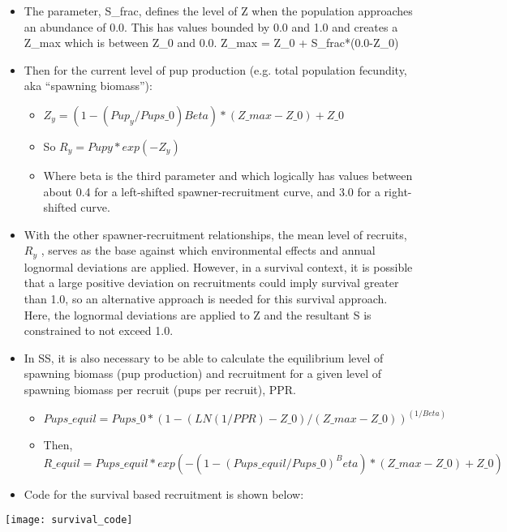 \begin{description}
\begin{itemize}
		\item The parameter, S\_frac, defines the level of Z when the population approaches an abundance of 0.0.  This has values bounded by 0.0 and 1.0 and creates a Z\_max which is between Z\_0 and 0.0. Z\_max = Z\_0 + S\_frac*(0.0-Z\_0)
		\item Then for the current level of pup production (e.g. total population fecundity, aka “spawning biomass”):
		\begin{itemize}
			\item $Z_y=(1 - (Pup_y/Pups\_0)Beta)*(Z\_max-Z\_0)+Z\_0$
			\item So $R_y = Pupy * exp(-Z_y)$
			\item Where beta is the third parameter and which logically has values between about 0.4 for a left-shifted spawner-recruitment curve, and 3.0 for a right-shifted curve.
		\end{itemize}
		\item With the other spawner-recruitment relationships, the mean level of recruits, $R_y$ , serves as the base against which environmental effects and annual lognormal deviations are applied.  However, in a survival context, it is possible that a large positive deviation on recruitments could imply survival greater than 1.0, so an alternative approach is needed for this survival approach.  Here, the lognormal deviations are applied to Z and the resultant S is constrained to not exceed 1.0.
		\item In SS, it is also necessary to be able to calculate the equilibrium level of spawning biomass (pup production) and recruitment for a given level of spawning biomass per recruit (pups per recruit), PPR.
		\begin{itemize}
			\item $Pups\_equil = Pups\_0 * (1 - (LN(1/PPR) - Z\_0)/(Z\_max - Z\_0))^{(1/Beta)} $
			\item Then, $R\_equil = Pups\_equil * exp(-(1 - (Pups\_equil/Pups\_0)^Beta)*(Z\_max-Z\_0)+Z\_0)$
		\end{itemize}
		\item Code for the survival based recruitment is shown below:
	\end{itemize}

	\texttt{[image: survival\_code]}


\end{description}
